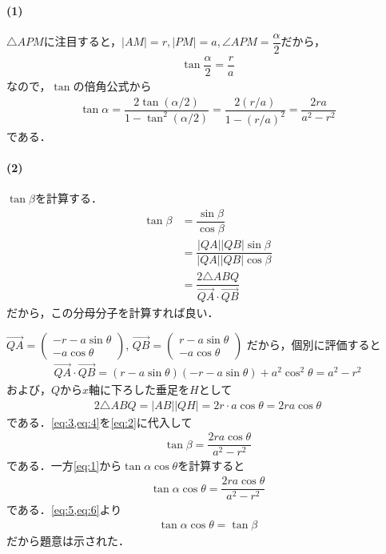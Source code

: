 \documentclass[../../main.tex]{subfiles}
\begin{document}
\paragraph{(1)}

$\triangle APM$に注目すると，$|AM|=r,|PM|=a,\angle APM=\dfrac{\alpha}{2}$だから，
\begin{align}
  \tan\dfrac{\alpha}{2} = \dfrac{r}{a}
\end{align}
なので，$\tan$の倍角公式から
\begin{align}
  \tan \alpha
  = \dfrac{2\tan(\alpha/2)}{1-\tan^2(\alpha/2)}
  = \dfrac{2(r/a)}{1-(r/a)^2}
  = \dfrac{2ra}{a^2-r^2} \label{eq:1}
\end{align}
である．

\paragraph{(2)}

$\tan\beta$を計算する．
\begin{align}
  \tan \beta
  &= \dfrac{\sin\beta}{\cos\beta} \\
  &= \dfrac{|QA||QB| \sin\beta}{|QA||QB|\cos\beta} \\
  &= \dfrac{2\triangle ABQ}{\overrightarrow{QA}\cdot\overrightarrow{QB}} \label{eq:2}
\end{align}
だから，この分母分子を計算すれば良い．

$\overrightarrow{QA} =
\begin{pmatrix} -r - a \sin\theta \\ -a \cos\theta
\end{pmatrix}$, $\overrightarrow{QB} =
\begin{pmatrix} r - a \sin\theta \\ -a \cos\theta
\end{pmatrix}$
だから，個別に評価すると
\begin{align}
  \overrightarrow{QA}\cdot\overrightarrow{QB}
  = (r - a \sin\theta)(-r - a \sin\theta) + a^2 \cos^2\theta
  = a^2-r^2 \label{eq:3}
\end{align}
および，$Q$から$x$軸に下ろした垂足を$H$として
\begin{align}
  2\triangle ABQ = |AB||QH| = 2r\cdot a\cos\theta = 2ra\cos\theta \label{eq:4}
\end{align}
である．\cref{eq:3,eq:4}を\cref{eq:2}に代入して
\begin{align}
  \tan \beta = \dfrac{2ra\cos\theta}{a^2 - r^2}  \label{eq:5}
\end{align}
である．一方\cref{eq:1}から$\tan\alpha\cos\theta$を計算すると
\begin{align}
  \tan\alpha\cos\theta = \dfrac{2ra\cos\theta}{a^2-r^2} \label{eq:6}
\end{align}
である．\cref{eq:5,eq:6}より
\begin{align}
  \tan \alpha \cos\theta = \tan \beta
\end{align}
だから題意は示された．

\newpage
\end{document}
